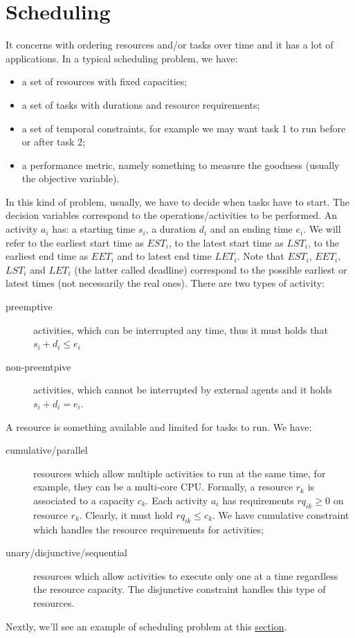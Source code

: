 \documentclass[10pt,a4paper]{article}
\begin{document}
\section{Scheduling}
It concerns with ordering resources and/or tasks over time and it has a lot of
applications. In a typical scheduling problem, we have:
\begin{itemize}
    \item a set of resources with fixed capacities;
    \item a set of tasks with durations and resource requirements;
    \item a set of temporal constraints, for example we may want task 1 to run
    before or after task 2;
    \item a performance metric, namely something to measure the goodness
    (usually the objective variable).
\end{itemize}
In this kind of problem, usually, we have to decide when tasks have to start.
The decision variables correspond to the operations/activities to be performed.
An activity $a_i$ has: a starting time $s_i$, a duration $d_i$ and an ending
time $e_i$. We will refer to the earliest start time as $EST_i$, to the latest
start time as $LST_i$, to the earliest end time as $EET_i$ and to latest end
time $LET_i$. Note that $EST_i$, $EET_i$, $LST_i$ and $LET_i$ (the latter called
deadline) correspond to the possible earliest or latest times (not necessarily
the real ones). There are two types of activity:
\begin{description}
    \item[preemptive] activities, which can be interrupted any time, thus it
    must holds that $s_i + d_i \leq e_i $
    \item[non-preemtpive] activities, which cannot be interrupted by external
    agents and it holds $s_i + d_i = e_i $.
\end{description}
\pagebreak
A resource is something available and limited for tasks to run. We have:
\begin{description}
    \item[cumulative/parallel] resources which allow multiple activities to run
    at the same time, for example, they can be a multi-core CPU. Formally, a
    resource $r_k$ is associated to a capacity $c_k$. Each activity $a_i$ has
    requirements $rq_{ik} \geq 0$ on resource $r_k$. Clearly, it must hold
    $rq_{ik} \leq c_k$. We have cumulative constraint which handles the resource
    requirements for activities;
    \item[unary/disjunctive/sequential] resources which allow activities to
    execute only one at a time regardless the resource capacity. The disjunctive
    constraint handles this type of resources.
\end{description}
Nextly, we'll see an example of scheduling problem at this
\hyperlink{rcpsp}{section}.
\end{document}
